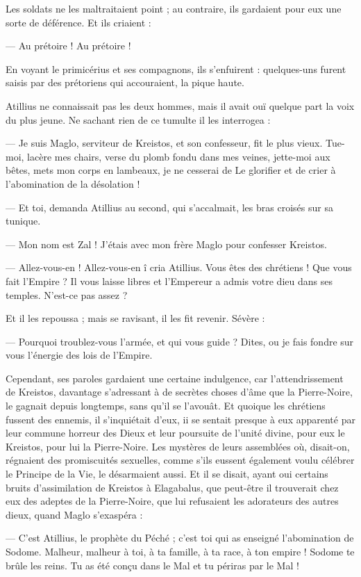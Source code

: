 \documentclass[a4paper, 11pt, oneside, polutonikogreek, french]{article}
\begin{document}
Les soldats ne les maltraitaient point ; au contraire, ils gardaient pour eux une sorte de déférence. Et ils criaient :

--- Au prétoire ! Au prétoire !

En voyant le primicérius et ses compagnons, ils s'enfuirent : quelques-uns furent saisis par des prétoriens qui accouraient, la pique haute.

Atillius ne connaissait pas les deux hommes, mais il avait ouï quelque part la voix du plus jeune. Ne sachant rien de ce tumulte il les interrogea :

--- Je suis Maglo, serviteur de Kreistos, et son confesseur, fit le plus vieux. Tue-moi, lacère mes chairs, verse du plomb fondu dans mes veines, jette-moi aux bêtes, mets mon corps en lambeaux, je ne cesserai de Le glorifier et de crier à l'abomination de la désolation !

--- Et toi, demanda Atillius au second, qui s'accalmait, les bras croisés sur sa tunique.

--- Mon nom est Zal ! J'étais avec mon frère Maglo pour confesser Kreistos.

--- Allez-vous-en ! Allez-vous-en î cria Atillius. Vous êtes des chrétiens ! Que vous fait l'Empire ? Il vous laisse libres et l'Empereur a admis votre dieu dans ses temples. N'est-ce pas assez ?

Et il les repoussa ; mais se ravisant, il les fit revenir. Sévère :

--- Pourquoi troublez-vous l'armée, et qui vous guide ? Dites, ou je fais fondre sur vous l'énergie des lois de l'Empire.

Cependant, ses paroles gardaient une certaine indulgence, car l'attendrissement de Kreistos, davantage s'adressant à de secrètes choses d'âme que la Pierre-Noire, le gagnait depuis longtemps, sans qu'il se l'avouât. Et quoique les chrétiens fussent des ennemis, il s'inquiétait d'eux, ii se sentait presque à eux apparenté par leur commune horreur des Dieux et leur poursuite de l'unité divine, pour eux le Kreistos, pour lui la Pierre-Noire. Les mystères de leurs assemblées où, disait-on, régnaient des promiscuités sexuelles, comme s'ils eussent également voulu célébrer le Principe de la Vie, le désarmaient aussi. Et il se disait, ayant oui certains bruits d'assimilation de Kreistos à Elagabalus, que peut-être il trouverait chez eux des adeptes de la Pierre-Noire, que lui refusaient les adorateurs des autres dieux, quand Maglo s'exaspéra :

--- C'est Atillius, le prophète du Péché ; c'est toi qui as enseigné l'abomination de Sodome. Malheur, malheur à toi, à ta famille, à ta race, à ton empire ! Sodome te brûle les reins. Tu as été conçu dans le Mal et tu périras par le Mal !
\end{document}

